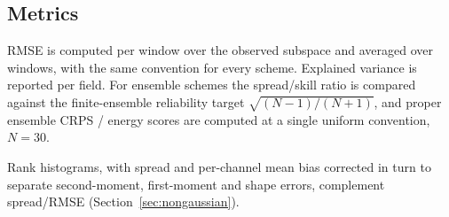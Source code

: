 \subsection{Metrics}
RMSE is computed per window over the observed subspace and averaged over windows,
with the same convention for every scheme.
Explained variance is reported per field. For ensemble schemes the spread/skill
ratio is compared against the finite-ensemble reliability target
$\sqrt{(N-1)/(N+1)}$, and proper ensemble CRPS / energy scores are computed at a
single uniform convention, $N=30$.

Rank histograms, with spread and per-channel mean bias corrected in turn to
separate second-moment, first-moment and shape errors, complement spread/RMSE
(Section~\ref{sec:nongaussian}).
